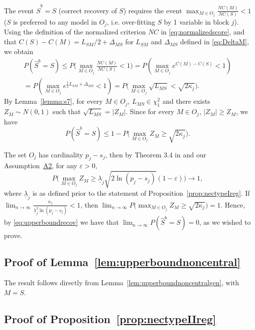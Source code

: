 \documentclass[bj,authoryear]{imsart}
\theoremstyle{plain}
\newcommand{\M}{\mathcal{M}}
\begin{document}
The event $\hat{S}^b=S$ (correct recovery of $S$) requires the event 
$\max_{M\in O_j}\frac{NC(M)}{NC(S)}<1$ ($S$ is preferred to any model in $O_j$, i.e. over-fitting $S$ by 1 variable in block $j$). %
Using the definition of the normalized criterion $NC$ in \eqref{eq:normalizedscore}, and that $C(S)-C(M)=L_{SM}/2 + \Delta_{MS}$ for $L_{SM}$ and $\Delta_{MS}$ defined in \eqref{eq:DeltaM}, we obtain
\begin{align}
P(\hat{S}^b=S) 
\leq P\Big(\max_{M\in O_j}\frac{NC(M)}{NC(S)}<1\Big)
= P \left( \max_{M\in O_j} e^{C(M)-C(S)} <1 \right)
\nonumber \\
= P \left( \max_{M\in O_j} e^{\frac{1}{2} L_{SM} + \Delta_{MS}} < 1 \right)
=
P\big(\max_{M\in O_j}\sqrt{L_{MS}}<\sqrt{2\kappa_j}\Big).
\nonumber
\end{align}
By Lemma~\ref{lemma:s7}, for every $M\in O_j$, $L_{MS}\in \chi^2_1$ and there exists $Z_M\sim N(0,1)$ such that $\sqrt{L_{MS}}=|Z_M|$. Since for every $M\in O_j$, $|Z_M|\geq Z_M$, we have
\begin{equation}\label{eq:upperboundrecov}
    P(\hat{S}^b=S) \leq  1-P\big(\max_{M\in O_j}Z_M\geq\sqrt{2\kappa_j}\Big).
\end{equation}

The set $O_j$ has cardinality $p_j-s_j$, then by Theorem 3.4 in \cite{hartigan} and our Assumption~\hyperlink{lab:A2}{A2}, for any $\varepsilon>0$,
$$P\big(\max_{M\in O_j}Z_M \geq \underline{\lambda}_j \sqrt{2 \ln(p_j-s_j)}(1-\varepsilon)\big) \to 1,$$
where $\underline{\lambda}_j$ is as defined prior to the statement of Proposition~\ref{prop:nectypeIreg}.
If $\lim_{n\to\infty}\frac{\kappa_j}{\underline{\lambda}_j^2\ln(p_j-s_j)} <1$, then $\lim_{n \to \infty} P\big(\max_{M\in O_j}Z_M\geq\sqrt{2\kappa_j}\big) = 1$. Hence, by \eqref{eq:upperboundrecov} we have that $\lim_{n \to \infty} P(\hat{S}^b=S) = 0$, as we wished to prove.

\subsection{Proof of Lemma~\ref{lem:upperboundnoncentral}}
The result follows directly from Lemma~\ref{lem:upperboundnoncentralgen}, with $M=S$. 


\subsection{Proof of Proposition~\ref{prop:nectypeIIreg}}
\end{document}
